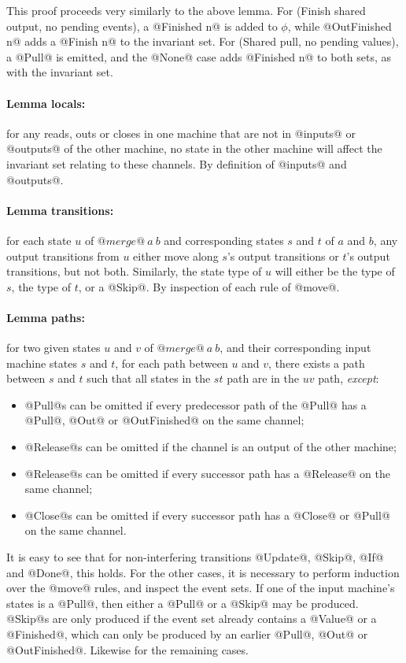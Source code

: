 This proof proceeds very similarly to the above lemma.
For (Finish shared output, no pending events), a @Finished n@ is added to $\phi$, while @OutFinished n@ adds a @Finish n@ to the invariant set.
For (Shared pull, no pending values), a @Pull@ is emitted, and the @None@ case adds @Finished n@ to both sets, as with the invariant set.


\paragraph{Lemma locals:} for any reads, outs or closes in one machine that are not in @inputs@ or @outputs@ of the other machine, no state in the other machine will affect the invariant set relating to these channels.
By definition of @inputs@ and @outputs@.

\paragraph{Lemma transitions:} for each state $u$ of $@merge@~a~b$ and corresponding states $s$ and $t$ of $a$ and $b$, any output transitions from $u$ either move along $s$'s output transitions or $t$'s output transitions, but not both.
Similarly, the state type of $u$ will either be the type of $s$, the type of $t$, or a @Skip@.
By inspection of each rule of @move@.

\paragraph{Lemma paths:} for two given states $u$ and $v$ of $@merge@~a~b$, and their corresponding input machine states $s$ and $t$, for each path between $u$ and $v$, there exists a path between $s$ and $t$ such that all states in the $st$ path are in the $uv$ path, \emph{except}:
\begin{itemize}
\item @Pull@s can be omitted if every predecessor path of the @Pull@ has a @Pull@, @Out@ or @OutFinished@ on the same channel;
\item @Release@s can be omitted if the channel is an output of the other machine;
\item @Release@s can be omitted if every successor path has a @Release@ on the same channel;
\item @Close@s can be omitted if every successor path has a @Close@ or @Pull@ on the same channel.
\end{itemize}

It is easy to see that for non-interfering transitions @Update@, @Skip@, @If@ and @Done@, this holds.
For the other cases, it is necessary to perform induction over the @move@ rules, and inspect the event sets.
If one of the input machine's states is a @Pull@, then either a @Pull@ or a @Skip@ may be produced.
@Skip@s are only produced if the event set already contains a @Value@ or a @Finished@, which can only be produced by an earlier @Pull@, @Out@ or @OutFinished@.
Likewise for the remaining cases.


